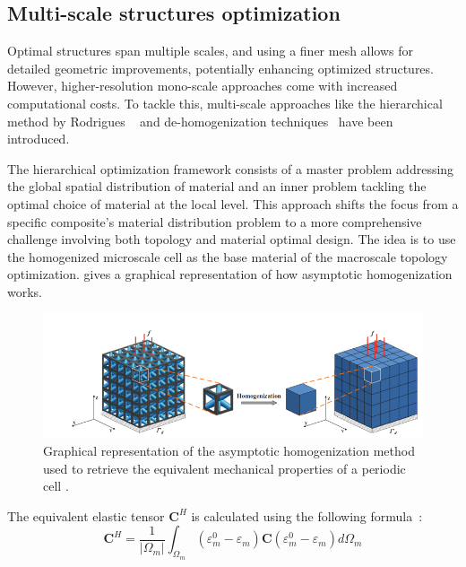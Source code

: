 \subsection{Multi-scale structures optimization}
Optimal structures span multiple scales, and using a finer mesh allows for detailed geometric improvements, potentially enhancing optimized structures. However, higher-resolution mono-scale approaches come with increased computational costs. To tackle this, multi-scale approaches like the hierarchical method by Rodrigues \etal~ and de-homogenization techniques~ have been introduced.

The hierarchical optimization framework consists of a master problem addressing the global spatial distribution of material and an inner problem tackling the optimal choice of material at the local level. This approach shifts the focus from a specific composite's material distribution problem to a more comprehensive challenge involving both topology and material optimal design. The idea is to use the homogenized microscale cell as the base material of the macroscale topology optimization.  gives a graphical representation of how asymptotic homogenization works.
\begin{figure}
    \centering
    \includegraphics[width=\linewidth]{figures/02_literature/homo.png}
    \caption{Graphical representation of the asymptotic homogenization method used to retrieve the equivalent mechanical properties of a periodic cell \cite{wang_concurrent_2020}.}
    \label{fig:02_homogen}
\end{figure}
The equivalent elastic tensor $\mathbf{C}^{H}$ is calculated using the following formula~:
\begin{equation}
    \mathbf{C}^{H}=\frac{1}{\left|\Omega_{m}\right|} \int_{\Omega_{m}} \left(\varepsilon_{m}^{0}-\varepsilon_{m}\right)\mathbf{C}\left(\varepsilon_{m}^{0}-\varepsilon_{m}\right) d \Omega_{m}
\end{equation}
